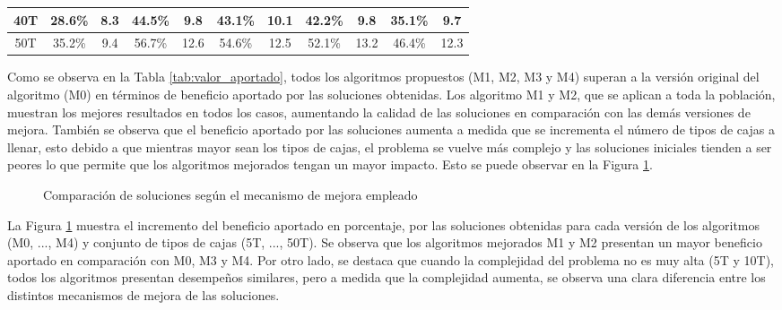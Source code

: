 \documentclass[openany]{article}
\begin{document}
\begin{table}[H]
\begin{tabular}{|c|c|c|c|c|c|c|c|c|c|c|}
        40T                                    & 28.6\%                           & 8.3                              & 44.5\%                           & 9.8                              & 43.1\%                           & 10.1        & 42.2\%         & 9.8         & 35.1\%         & 9.7         \\ \hline
        50T                                    & 35.2\%                           & 9.4                              & 56.7\%                           & 12.6                             & 54.6\%                           & 12.5        & 52.1\%         & 13.2        & 46.4\%         & 12.3        \\ \hline
    \end{tabular}
\end{table}

Como se observa en la Tabla \ref{tab:valor_aportado}, todos los algoritmos propuestos (M1, M2, M3 y M4) superan a la versión original del algoritmo (M0) en términos de beneficio aportado por las soluciones obtenidas. Los algoritmo M1 y M2, que se aplican a toda la población, muestran los mejores resultados en todos los casos, aumentando la calidad de las soluciones en comparación con las demás versiones de mejora. También se observa que el beneficio aportado por las soluciones aumenta a medida que se incrementa el número de tipos de cajas a llenar, esto debido a que mientras mayor sean los tipos de cajas, el problema se vuelve más complejo y las soluciones iniciales tienden a ser peores lo que permite que los algoritmos mejorados tengan un mayor impacto. Esto se puede observar en la Figura \ref{fig:valores}.

\begin{figure}[H]
    \centering
    
    \caption{Comparación de soluciones según el mecanismo de mejora empleado}
    \label{fig:valores}
\end{figure}


La Figura \ref{fig:valores} muestra el incremento del beneficio aportado en porcentaje, por las soluciones obtenidas para cada versión de los algoritmos (M0, ..., M4) y conjunto de tipos de cajas (5T, ..., 50T). Se observa que los algoritmos mejorados M1 y M2 presentan un mayor beneficio aportado en comparación con M0, M3 y M4. Por otro lado, se destaca que cuando la complejidad del problema no es muy alta (5T y 10T), todos los algoritmos presentan desempeños similares, pero a medida que la complejidad aumenta, se observa una clara diferencia entre los distintos mecanismos de mejora de las soluciones.
\end{document}
